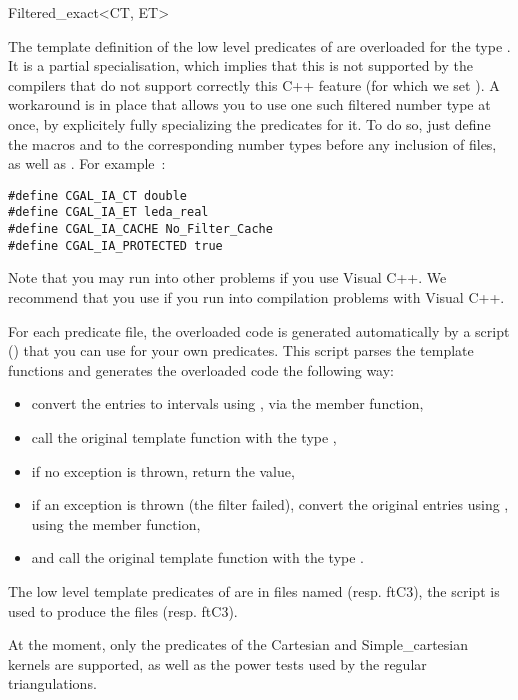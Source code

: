 \begin{ccRefClass}{Filtered_exact<CT, ET>}
\ccImplementation

The template definition of the low level predicates of {\cgal} are overloaded
for the type .  It is a partial specialisation,
which implies that this is not supported by the compilers that do not support
correctly this C++ feature (for which we set ).
A workaround is in place that allows you to use
one such filtered number type at once, by explicitely fully specializing the
predicates for it.  To do so, just define the macros  and
 to the corresponding number types before any inclusion of
{\cgal} files, as well as .  For example~:

\begin{verbatim} 
#define CGAL_IA_CT double
#define CGAL_IA_ET leda_real
#define CGAL_IA_CACHE No_Filter_Cache
#define CGAL_IA_PROTECTED true
\end{verbatim}

Note that you may run into other problems if you use Visual C++.  We recommend
that you use  if you run into compilation problems with
Visual C++.

For each predicate file, the overloaded code is generated automatically by a
 script () that you can
use for your own predicates.
This script parses the template functions and generates the
overloaded code the following way:
\begin{itemize}
\item convert the entries to intervals using
    , via the  member function,
\item call the original template function with the type
    ,
\item if no exception is thrown, return the value,
\item if an exception is thrown (the filter failed), convert the original
    entries using , using the  member
    function,
\item and call the original template function with the type .
\end{itemize}

\ccExample

The low level template predicates of {\cgal} are in files named
 (resp. ftC3), the script is used
to produce the files 
(resp. ftC3).

At the moment, only the predicates of the Cartesian and Simple\_cartesian
kernels are supported, as well as the power tests used by the regular
triangulations.

\end{ccRefClass}
